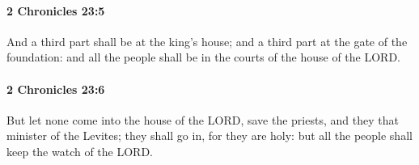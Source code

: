 		\paragraph{2 Chronicles 23:5} %
			\label{2CHRONICLES-23-5}

			And a third part shall be at the king's house; and a third part at the gate of the foundation: and all the people shall be in the courts of the house of the LORD.


		\paragraph{2 Chronicles 23:6} %
			\label{2CHRONICLES-23-6}

			But let none come into the house of the LORD, save the priests, and they that minister of the Levites; they shall go in, for they are holy: but all the people shall keep the watch of the LORD.

